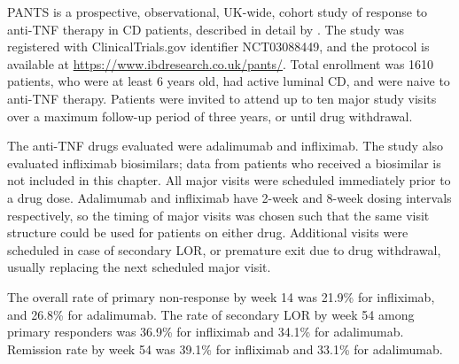 \gls{PANTS} is a prospective, observational, UK-wide, cohort study of response to anti-\gls{TNF} therapy in \gls{CD} patients, described in detail by \textcite{kennedy2019PredictorsAntiTNFTreatment}.
The study was registered with ClinicalTrials.gov identifier NCT03088449, and the protocol is available at \url{https://www.ibdresearch.co.uk/pants/}.
Total enrollment was 1610 patients, who were at least 6 years old, had active luminal \gls{CD}, and were naive to anti-\gls{TNF} therapy.
Patients were invited to attend up to ten major study visits over a maximum follow-up period of three years, or until drug withdrawal.

The anti-\gls{TNF} drugs evaluated were adalimumab and infliximab.
The study also evaluated infliximab biosimilars; data from patients who received a biosimilar is not included in this chapter.
All major visits were scheduled immediately prior to a drug dose.
Adalimumab and infliximab have 2-week and 8-week dosing intervals respectively, so the timing of major visits was chosen such that the same visit structure could be used for patients on either drug.
Additional visits were scheduled in case of secondary \gls{LOR}, or premature exit due to drug withdrawal, usually replacing the next scheduled major visit.

The overall rate of primary non-response by week 14 was 21.9\% for infliximab, and 26.8\% for adalimumab.
The rate of secondary \gls{LOR} by week 54 among primary responders was 36.9\% for infliximab and 34.1\% for adalimumab.
Remission rate by week 54 was 39.1\% for infliximab and 33.1\% for adalimumab.


